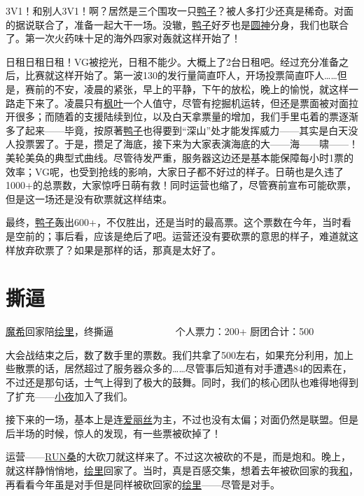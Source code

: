 3V1！和别人3V1！啊？居然是三个围攻一只\uline{鸭子}？被人多打少还真是稀奇。对面的据说联合了，准备一起大干一场。没辙，\uline{鸭子}好歹也是\uline{圆神}分身，我们也联合了。第一次火药味十足的海外四家对轰就这样开始了！

日租日租日租！VG被挖光，日租不能少。大概上了2台日租吧。经过充分准备之后，比赛就这样开始了。第一波130的发行量简直吓人，开场投票简直吓人……但是，赛前的不安，凌晨的紧张，早上的平静，下午的放松，晚上的愉悦，就这样一路走下来了。凌晨只有\uline{枫叶}一个人值守，尽管有挖掘机运转，但还是票面被对面拉开很多；而随着的支援陆续到位，以及白天拿票量的增加，我们手里屯着的票逐渐多了起来——毕竟，按原著\uline{鸭子}也得要到“深山”处才能发挥威力——其实是白天没人投票罢了。于是，攒足了海底，接下来为大家表演海底的大——海——啸——！美轮美奂的典型式曲线。尽管待发严重，服务器这边还是基本能保障每小时1票的效率；VG呢，也受到抢线的影响，大家日子都不好过的样子。日萌也是久违了1000+的总票数，大家惊呼日萌有救！同时运营也缩了，尽管赛前宣布可能砍票，但是这一场还是没有砍票就这样结束。

最终，\uline{鸭子}轰出600+，不仅胜出，还是当时的最高票。这个票数在今年，当时看是空前的；事后看，应该是绝后了吧。运营还没有要砍票的意思的样子，难道就这样放弃砍票了？如果是那样的话，那真是太好了。

\chapter{撕逼}
\begin{center}
{\subTitle \uline{魔希}回家陪\uline{绘里}，终撕逼}
\subMemo
　　　　　　个人票力：200+ 厨团合计：500
\end{center}

大会战结束之后，数了数手里的票数。我们共拿了500左右，如果充分利用，加上些散票的话，居然超过了服务器众多的……尽管事后知道有对手遭遇84的因素在，不过还是那句话，士气上得到了极大的鼓舞。同时，我们的核心团队也难得地得到了扩充——\uline{小夜}加入了我们。

接下来的一场，基本上是连\uline{爱丽丝}为主，不过也没有太偏；对面仍然是联盟。但是后半场的时候，惊人的发现，有一些票被砍掉了！

运营——\uline{RUN桑}的大砍刀就这样来了。不过这次被砍的不是，而是炮和。晚上，就这样静悄悄地，\uline{绘里}回家了。当时，真是百感交集，想着去年被砍回家的我\uline{和}，再看看今年虽是对手但是同样被砍回家的\uline{绘里}——尽管是对手。

